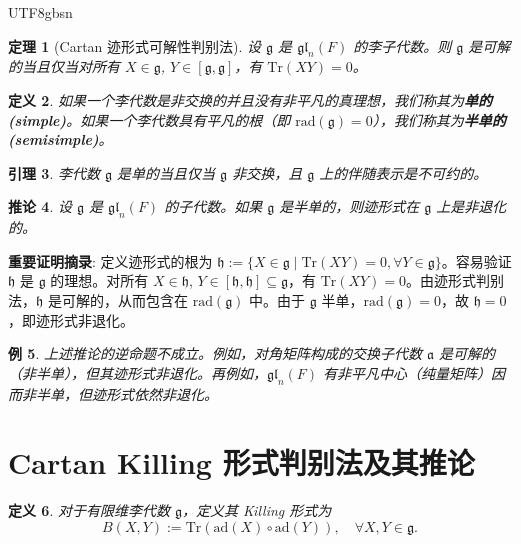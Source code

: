 \documentclass[11pt]{article}
\newtheorem{theorem}{定理}[section]
\newtheorem{lemma}[theorem]{引理}
\newtheorem{corollary}[theorem]{推论}
\newtheorem{definition}[theorem]{定义}
\newtheorem{example}[theorem]{例}
\begin{document}
\begin{CJK*}{UTF8}{gbsn}
\begin{theorem}[Cartan 迹形式可解性判别法]
设 $\mathfrak{g}$ 是 $\mathfrak{gl}_n(F)$ 的李子代数。则 $\mathfrak{g}$ 是可解的当且仅当对所有 $X \in \mathfrak{g}$, $Y \in [\mathfrak{g}, \mathfrak{g}]$，有 $\mathrm{Tr}(XY) = 0$。
\end{theorem}

\begin{definition}
如果一个李代数是非交换的并且没有非平凡的真理想，我们称其为\textbf{单的 (simple)}。如果一个李代数具有平凡的根（即 $\mathrm{rad}(\mathfrak{g})=0$），我们称其为\textbf{半单的 (semisimple)}。
\end{definition}

\begin{lemma}
李代数 $\mathfrak{g}$ 是单的当且仅当 $\mathfrak{g}$ 非交换，且 $\mathfrak{g}$ 上的伴随表示是不可约的。
\end{lemma}

\begin{corollary}
设 $\mathfrak{g}$ 是 $\mathfrak{gl}_n(F)$ 的子代数。如果 $\mathfrak{g}$ 是半单的，则迹形式在 $\mathfrak{g}$ 上是非退化的。
\end{corollary}
\textbf{重要证明摘录}:
定义迹形式的根为 $\mathfrak{h} := \{X \in \mathfrak{g} \mid \mathrm{Tr}(XY) = 0, \forall Y \in \mathfrak{g}\}$。容易验证 $\mathfrak{h}$ 是 $\mathfrak{g}$ 的理想。对所有 $X \in \mathfrak{h}$, $Y \in [\mathfrak{h}, \mathfrak{h}] \subseteq \mathfrak{g}$，有 $\mathrm{Tr}(XY) = 0$。由迹形式判别法，$\mathfrak{h}$ 是可解的，从而包含在 $\mathrm{rad}(\mathfrak{g})$ 中。由于 $\mathfrak{g}$ 半单，$\mathrm{rad}(\mathfrak{g})=0$，故 $\mathfrak{h}=0$，即迹形式非退化。

\begin{example}
上述推论的逆命题不成立。例如，对角矩阵构成的交换子代数 $\mathfrak{a}$ 是可解的（非半单），但其迹形式非退化。再例如，$\mathfrak{gl}_n(F)$ 有非平凡中心（纯量矩阵）因而非半单，但迹形式依然非退化。
\end{example}

\section{Cartan Killing 形式判别法及其推论}

\begin{definition}
对于有限维李代数 $\mathfrak{g}$，定义其 Killing 形式为
$$ B(X, Y) := \mathrm{Tr}(\mathrm{ad}(X) \circ \mathrm{ad}(Y)), \quad \forall X, Y \in \mathfrak{g}. $$
\end{definition}


\end{CJK*}
\end{document}

